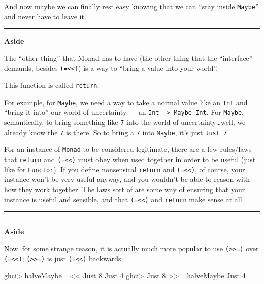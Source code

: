 \documentclass[]{article}
\newenvironment{Shaded}{\begin{snugshade}}{\end{snugshade}}
\newcommand{\DataTypeTok}[1]{\textcolor[rgb]{0.13,0.29,0.53}{#1}}
\newcommand{\DecValTok}[1]{\textcolor[rgb]{0.00,0.00,0.81}{#1}}
\newcommand{\FunctionTok}[1]{\textcolor[rgb]{0.00,0.00,0.00}{#1}}
\newcommand{\NormalTok}[1]{#1}
\begin{document}
And now maybe we can finally rest easy knowing that we can ``stay inside
\texttt{Maybe}'' and never have to leave it.

\begin{center}\rule{0.5\linewidth}{\linethickness}\end{center}

\textbf{Aside}

The ``other thing'' that Monad has to have (the other thing that the
``interface'' demands, besides \texttt{(=\textless{}\textless{})}) is a way to
``bring a value into your world''.

This function is called \texttt{return}.

For example, for \texttt{Maybe}, we need a way to take a normal value like an
\texttt{Int} and ``bring it into'' our world of uncertainty --- an
\texttt{Int\ -\textgreater{}\ Maybe\ Int}. For \texttt{Maybe}, semantically, to
bring something like \texttt{7} into the world of uncertainty\ldots{}well, we
already know the \texttt{7} is there. So to bring a \texttt{7} into
\texttt{Maybe}, it's just \texttt{Just\ 7}

For an instance of \texttt{Monad} to be considered legitimate, there are a few
rules/laws that \texttt{return} and \texttt{(=\textless{}\textless{})} must obey
when used together in order to be useful (just like for \texttt{Functor}). If
you define nonsensical \texttt{return} and \texttt{(=\textless{}\textless{})},
of course, your instance won't be very useful anyway, and you wouldn't be able
to reason with how they work together. The laws sort of are some way of ensuring
that your instance is useful and sensible, and that
\texttt{(=\textless{}\textless{})} and \texttt{return} make sense at all.

\begin{center}\rule{0.5\linewidth}{\linethickness}\end{center}

\begin{center}\rule{0.5\linewidth}{\linethickness}\end{center}

\textbf{Aside}

Now, for some strange reason, it is actually much more popular to use
\texttt{(\textgreater{}\textgreater{}=)} over
\texttt{(=\textless{}\textless{})}; \texttt{(\textgreater{}\textgreater{}=)} is
just \texttt{(=\textless{}\textless{})} backwards:

\begin{Shaded}
\begin{Highlighting}[]
\NormalTok{ghci}\FunctionTok{>}\NormalTok{ halveMaybe }\FunctionTok{=<<} \DataTypeTok{Just} \DecValTok{8}
\DataTypeTok{Just} \DecValTok{4}
\NormalTok{ghci}\FunctionTok{>} \DataTypeTok{Just} \DecValTok{8} \FunctionTok{>>=}\NormalTok{ halveMaybe}
\DataTypeTok{Just} \DecValTok{4}
\end{Highlighting}
\end{Shaded}
\end{document}
